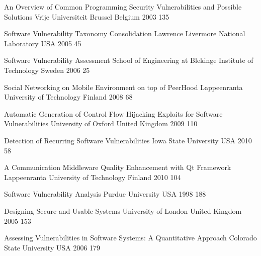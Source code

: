 \renewcommand{\refname}{REFERENCES} %
\cleardoublepage
{}
{}

\begin{thebibliography}{9}


		{}
		{An Overview of Common Programming Security Vulnerabilities and Possible Solutions}
		{Vrije Universiteit Brussel}
		{Belgium}
		{2003}
		{135}
	
		{}
		{Software Vulnerability Taxonomy Consolidation}
		{Lawrence Livermore National Laboratory}
		{USA}
		{2005}
		{45}
	
		{}
		{Software Vulnerability Assessment}
		{School of Engineering at Blekinge Institute of Technology}
		{Sweden}
		{2006}
		{25}
	
		{}
		{Social Networking on Mobile Environment on top of PeerHood}
		{Lappeenranta University of Technology}
		{Finland}
		{2008}
		{68}
	
		{}
		{Automatic Generation of Control Flow Hijacking Exploits for Software Vulnerabilities}
		{University of Oxford}
		{United Kingdom}
		{2009}
		{110}
	
		{}
		{Detection of Recurring Software Vulnerabilities}
		{Iowa State University}
		{USA}
		{2010}
		{58}
	
		{}
		{A Communication Middleware Quality Enhancement with {Qt} Framework}
		{Lappeenranta University of Technology}
		{Finland}
		{2010}
		{104}


		{}
		{Software Vulnerability Analysis}
		{Purdue University}
		{USA}
		{1998}
		{188}
		
		{}
		{Designing Secure and Usable Systems}
		{University of London}
		{United Kingdom}
		{2005}
		{153}
	
		{}
		{Assessing Vulnerabilities in Software Systems: A Quantitative Approach}
		{Colorado State University}
		{USA}
		{2006}
		{179}
		

\end{thebibliography}
